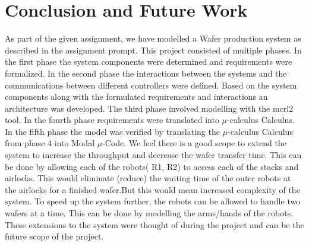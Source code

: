 \documentclass[a4paper,12pt]{article}
\begin{document}
	\section{Conclusion and Future Work}
	As part of the given assignment, we have modelled a Wafer production system as described in the assignment prompt. This project consisted of multiple phases. In the first phase the system components were determined and requirements were formalized. In the second phase the interactions between the systems and the communications between different controllers were defined. Based on the system components along with the formulated requirements and interactions an architecture was developed. The third phase involved modelling with the mcrl2 tool. In the fourth phase requirements were translated into $\mu$-calculus Calculus. In the fifth phase the model was verified by translating the $\mu$-calculus Calculus from phase 4 into Modal $\mu$-Code. We feel there is a good scope to extend the system to increase the throughput and decrease the wafer transfer time. This can be done by allowing each of the robots( R1, R2) to access each of the stacks and airlocks. This would eliminate (reduce) the waiting time of the outer robots at the airlocks for a finished wafer.But this would mean increased complexity of the system. To speed up the system further, the robots can be allowed to handle two wafers at a time. This can be done by modelling the arms/hands of the robots. These extensions to the system were thought of during the project and can be the future scope of the project. 
	\newpage
	\appendix
\end{document}
